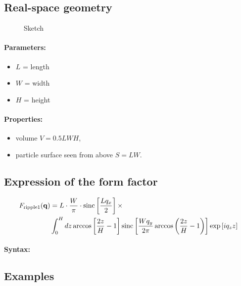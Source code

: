 \subsection{Real-space geometry}


\begin{figure}[ht]
\begin{center}
\caption{Sketch}
\end{center}
\end{figure}

\paragraph{Parameters:}
\begin{itemize}
\item $L$ = length 
\item $W$ = width 
\item $H$ = height 
\end{itemize}

\paragraph{Properties:}
\begin{itemize}
\item volume $V = 0.5 L W H $,
\item particle surface seen from above $S = L W$.
\end{itemize}

\subsection{Expression of the form factor}
\begin{align*}
F_{\rm{ripple1}}(\mathbf{q}) &=L \cdot \frac{W}{\pi}\cdot \operatorname{sinc}\left[\frac{Lq_x}{2}\right]\times \\ &\int_0^H{dz \arccos\left[\frac{2z}{H}-1\right]\operatorname{sinc}\left[\frac{Wq_y}{2\pi}\arccos\left(\frac{2z}{H} - 1\right)\right]\exp\left[iq_zz\right]}
\end{align*}

\paragraph{Syntax:} 

\subsection{Examples}


